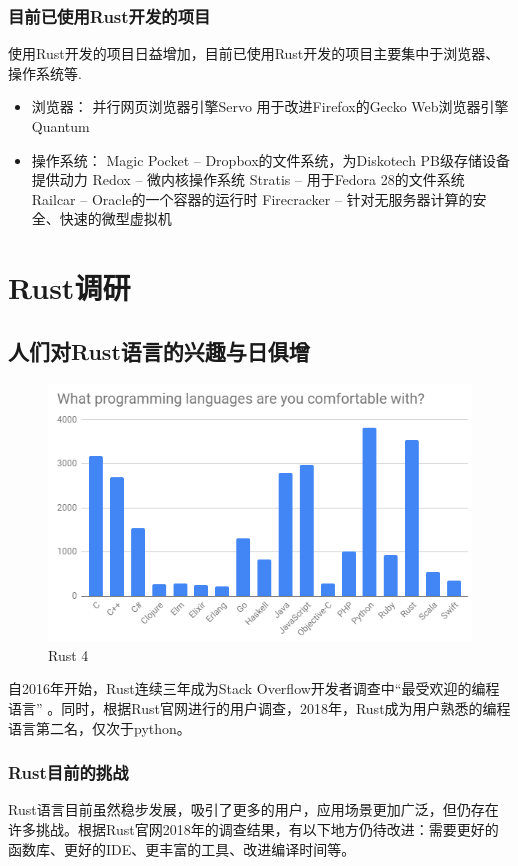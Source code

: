 \documentclass[12pt, a4paper]{article}
\begin{document}
		\subsubsection{目前已使用Rust开发的项目}
		使用Rust开发的项目日益增加，目前已使用Rust开发的项目主要集中于浏览器、操作系统等.   
		\begin{itemize}
			\item 浏览器：
			\subitem 并行网页浏览器引擎Servo
			\subitem 用于改进Firefox的Gecko Web浏览器引擎Quantum 
			\item 操作系统：
			\subitem Magic Pocket –  Dropbox的文件系统，为Diskotech PB级存储设备提供动力      
			\subitem Redox – 微内核操作系统   
			\subitem Stratis – 用于Fedora 28的文件系统   
			\subitem Railcar – Oracle的一个容器的运行时    
			\subitem Firecracker – 针对无服务器计算的安全、快速的微型虚拟机   
		\end{itemize}
	\section{Rust调研}
	
	\subsection{人们对Rust语言的兴趣与日俱增}
	
\begin{figure}[H]
	\centering
	\includegraphics[width=0.7\linewidth]{n4}
	\caption{Rust 4}
	\label{fig:n4}
\end{figure}
	自2016年开始，Rust连续三年成为Stack Overflow开发者调查中“最受欢迎的编程语言” 。同时，根据Rust官网进行的用户调查，2018年，Rust成为用户熟悉的编程语言第二名，仅次于python。
	
	
	
	\subsubsection{Rust目前的挑战}
	Rust语言目前虽然稳步发展，吸引了更多的用户，应用场景更加广泛，但仍存在许多挑战。根据Rust官网2018年的调查结果，有以下地方仍待改进：需要更好的函数库、更好的IDE、更丰富的工具、改进编译时间等。   
	
\end{document}
